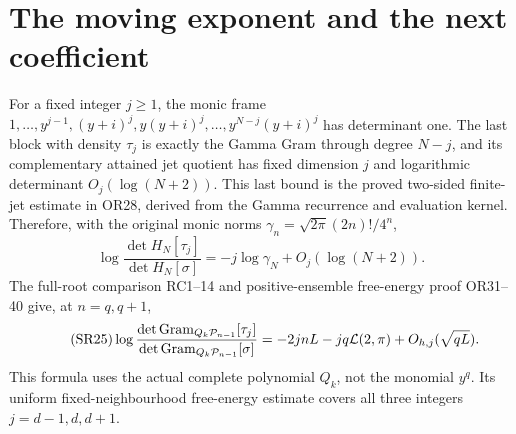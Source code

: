 \documentclass[11pt,a4paper]{article}
\begin{document}
\section{The moving exponent and the next coefficient}
For a fixed integer $j\ge1$, the monic frame
$1,\ldots,y^{j-1},(y+i)^j,y(y+i)^j,\ldots,y^{N-j}(y+i)^j$
has determinant one. The last block with density $\tau_j$ is exactly the
Gamma Gram through degree $N-j$, and its complementary attained jet quotient
has fixed dimension $j$ and logarithmic determinant $O_j(\log(N+2))$.
This last bound is the proved two-sided finite-jet estimate in OR28, derived
from the Gamma recurrence and evaluation kernel. Therefore, with the original
monic norms $\gamma_n=\sqrt{2\pi}(2n)!/4^n$,
\begin{equation}\tag{SR24}
 \log\frac{\det H_N[\tau_j]}{\det H_N[\sigma]}
 =-j\log\gamma_N+O_j(\log(N+2)).
\end{equation}
The full-root comparison RC1--14 and positive-ensemble free-energy proof OR31--40
give, at $n=q,q+1$,
\begin{equation}\tag{SR25}
 \log\frac{\det\operatorname{Gram}_{Q_k\mathcal P_{n-1}}[\tau_j]}
 {\det\operatorname{Gram}_{Q_k\mathcal P_{n-1}}[\sigma]}
 =-2jnL-jq\mathcal L(2,\pi)+O_{h,j}(\sqrt{qL}).
\end{equation}
This formula uses the actual complete polynomial $Q_k$, not the monomial
$y^q$. Its uniform fixed-neighbourhood free-energy estimate covers all three
integers $j=d-1,d,d+1$.
\end{document}
